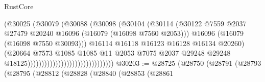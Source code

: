 \begin{lexlean}{RustCore}
\begin{coremodule}
                                                        (@30025
                                                          (@30079
                                                            (@30088
                                                              (@30098
                                                                (@30104
                                                                  (@30114
                                                                    (@30122
                                                                      @7559
                                                                      @2037
                                                                      @27479
                                                                      @20240
                                                                      @16096
                                                                      (@16079 (@16098 @7560 @2053)))
                                                                    @16096
                                                                    (@16079 (@16098 @7550 @30093)))
                                                                  @16114
                                                                  @16118
                                                                  @16123
                                                                  @16128
                                                                  @16134
                                                                  @20260)
                                                                (@20664
                                                                  @7573
                                                                  @1085
                                                                  @1085
                                                                  @11
                                                                  @2053
                                                                  @7075
                                                                  @2037
                                                                  @29248
                                                                  @29248
                                                                  @18125)))))))))))))))))))))))))))))))
@30203 := @28725
    (@28750
      (@28791
        (@28793
          (@28795
            (@28812
              (@28828
                (@28840
                  (@28853
                    (@28861

\end{coremodule}
\end{lexlean}

